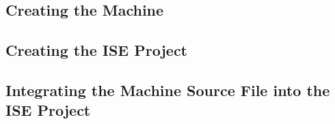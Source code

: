 \documentclass{article}
\begin{document}
            \subsection{Creating the Machine}
            \subsection{Creating the ISE Project}
            \subsection{Integrating the Machine Source File into the ISE Project}
\end{document}
